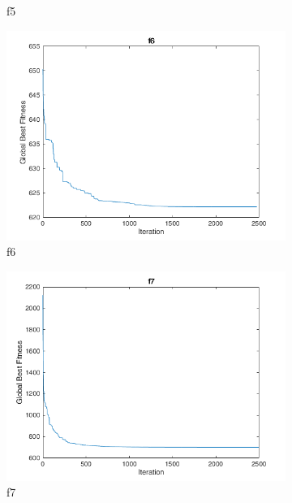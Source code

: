 \begin{figure}
\begin{subfigure}[b]{0.4\textwidth}
    \caption{f5}
  \end{subfigure}
  \begin{subfigure}[b]{0.4\textwidth}
    \includegraphics[width=\textwidth]{img/cecrt/f6}
    \caption{f6}
  \end{subfigure}
  \begin{subfigure}[b]{0.4\textwidth}
    \includegraphics[width=\textwidth]{img/cecrt/f7}
    \caption{f7}
  \end{subfigure}
  \begin{subfigure}[b]{0.4\textwidth}

\end{subfigure}
\end{figure}
